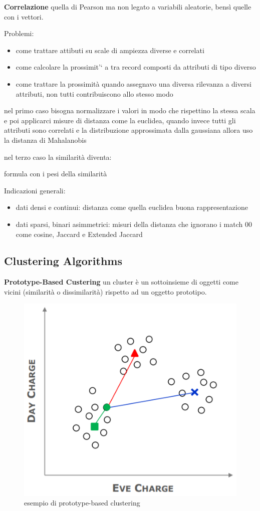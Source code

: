 \textbf{Correlazione} quella di Pearson ma non legato a variabili aleatorie, bensì quelle con i vettori. 

Problemi:
\begin{itemize}
	\item come trattare attibuti su scale di ampiezza diverse e correlati
	\item come calcolare la prossimit'` a tra record composti da attributi di tipo diverso
	\item come trattare la prossimit\`a quando assegnavo una diversa rilevanza a diversi attributi, non tutti contribuiscono allo stesso modo
\end{itemize}

nel primo caso bisogna normalizzare i valori in modo che rispettino la stessa scala e poi applicarci misure di distanza come la euclidea, quando invece tutti gli attributi sono correlati e la distribuzione approssimata dalla gaussiana allora uso la distanza di Mahalanobis

nel terzo caso la similarit\`a diventa:

formula con i pesi della similarit\`a 

Indicazioni generali:

\begin{itemize}
	\item dati densi e continui: distanza come quella euclidea buona rappresentazione
	\item dati sparsi, binari asimmetrici: misuri della distanza che ignorano i match 00 come cosine, Jaccard e Extended Jaccard
\end{itemize}

\subsection{Clustering Algorithms}

\textbf{Prototype-Based Custering} un cluster \`e un sottoinsieme di oggetti come vicini (similarit\`a o dissimilarit\`a) rispetto ad un oggetto prototipo. 

\begin{figure}[h!]
	\centering
	\includegraphics[height=0.4 \linewidth]{clustering/pict/prototype_cluster.png}
	\caption{esempio di prototype-based clustering}
\end{figure}

